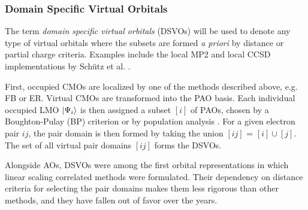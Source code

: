 
\subsubsection*{Domain Specific Virtual Orbitals}

The term \emph{domain specific virtual orbitals} (DSVOs) will be used to denote any type of virtual orbitals where the subsets are formed \emph{a priori} by distance or partial charge criteria. Examples include the local MP2 and local CCSD implementations by Schütz et al. \cite{Sch1999,Sch2001,Sch2000}.%

First, occupied CMOs are localized by one of the methods described above, e.g. FB or ER. Virtual CMOs are transformed into the PAO basis. Each individual occupied LMO $\ket{\Psi_i}$ is then assigned a subset $[i]$ of PAOs, chosen by a Boughton-Pulay (BP) criterion \cite{Bou1993} or by population analysis \cite{Mat2008}. For a given electron pair $ij$, the pair domain is then formed by taking the union $[ij]$ = $[i] \cup [j]$. The set of all virtual pair domains $[ij]$ forms the DSVOs.

Alongside AOs, DSVOs were among the first orbital representations in which linear scaling correlated methods were formulated. Their dependency on distance criteria for selecting the pair domains makes them less rigorous than other methods, and they have fallen out of favor over the years.


